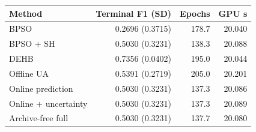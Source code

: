 \begin{tabular}{lrrr}\toprule
Method & Terminal F1 (SD) & Epochs & GPU s\\\midrule
BPSO & 0.2696 (0.3715) & 178.7 & 20.040\\
BPSO + SH & 0.5030 (0.3231) & 138.3 & 20.088\\
DEHB & 0.7356 (0.0402) & 195.0 & 20.044\\
Offline UA & 0.5391 (0.2719) & 205.0 & 20.201\\
Online prediction & 0.5030 (0.3231) & 137.3 & 20.086\\
Online + uncertainty & 0.5030 (0.3231) & 137.3 & 20.089\\
Archive-free full & 0.5030 (0.3231) & 137.7 & 20.080\\
\bottomrule\end{tabular}

